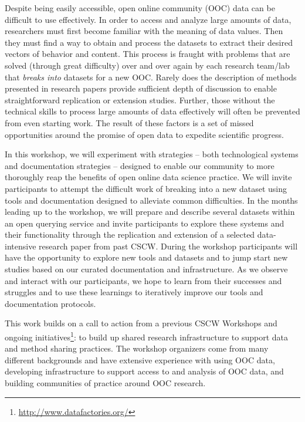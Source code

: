 Despite being easily accessible, open online community (OOC) data can be difficult to use effectively.  In order to access and analyze large amounts of data, researchers must first become familiar with the meaning of data values.  Then they must find a way to obtain and process the datasets to extract their desired vectors of behavior and content.  This process is fraught with problems that are solved (through great difficulty) over and over again by each research team/lab that \emph{breaks into} datasets for a new OOC.  Rarely does the description of methods presented in research papers provide sufficient depth of discussion to enable straightforward replication or extension studies.  Further, those without the technical skills to process large amounts of data effectively will often be prevented from even starting work.  The result of these factors is a set of missed opportunities around the promise of open data to expedite scientific progress.

In this workshop, we will experiment with strategies -- both technological systems and documentation strategies -- designed to enable our community to more thoroughly reap the benefits of open online data science practice.  We will invite participants to attempt the difficult work of breaking into a new dataset using tools and documentation designed to alleviate common difficulties.  In the months leading up to the workshop, we will prepare and describe several datasets within an open querying service and invite participants to explore these systems and their functionality through the replication and extension of a selected data-intensive research paper from past CSCW.  During the workshop participants will have the opportunity to explore new tools and datasets and to jump start new studies based on our curated documentation and infrastructure. As we observe and interact with our participants, we hope to learn from their successes and struggles and to use these learnings to iteratively improve our tools and documentation protocols.

This work builds on a call to action from a previous CSCW Workshops\cite{goggins14ocdata, morgan15advancing} and ongoing initiatives\footnote{\url{http://www.datafactories.org/}}: to build up shared research infrastructure\cite{wiggins14quality, morgan15advancing_report} to support data and method sharing practices. The workshop organizers come from many different backgrounds and have extensive experience with using OOC data, developing infrastructure to support access to and analysis of OOC data, and building communities of practice around OOC research.

